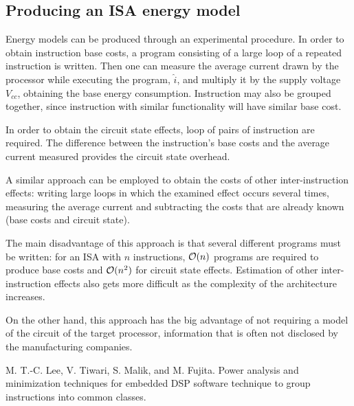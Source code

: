 \subsection{Producing an ISA energy model}
Energy models can be produced through an experimental procedure. \newline
In order to obtain instruction base costs, a program consisting of a large loop of a repeated instruction is written. Then one can measure the average current drawn by the processor while executing the program, $\hat{i}$, and multiply it by the supply voltage $V_{cc}$, obtaining the base energy consumption. \newline
Instruction may also be grouped together, since instruction with similar functionality will have similar base cost.\par 
In order to obtain the circuit state effects, loop of pairs of instruction are required. The difference between the instruction's base costs and the average current measured provides the circuit state overhead. \par 
A similar approach can be employed to obtain the costs of other inter-instruction effects: writing large loops in which the examined effect occurs several times, measuring the average current and subtracting the costs that are already known (base costs and circuit state). \par 
The main disadvantage of this approach is that several different programs must be written: for an ISA with $n$ instructions, $\mathcal{O}(n)$ programs are required to produce base costs and $\mathcal{O}(n^{2})$ for circuit state effects. \newline
Estimation of other inter-instruction effects also gets more difficult as the complexity of the architecture increases. \par
On the other hand, this approach has the big advantage of not requiring a model of the circuit of the target processor, information that is often not disclosed by the manufacturing companies.

 M. T.-C. Lee, V. Tiwari, S. Malik, and M. Fujita.
Power analysis and minimization techniques for
embedded DSP software 
technique to group instructions into common classes.

